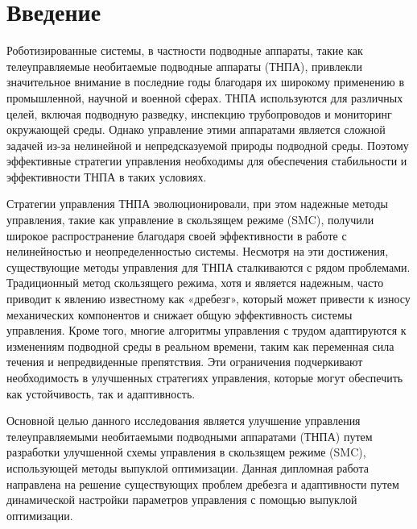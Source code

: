 \chapter{Введение}
\label{chap:intro}

Роботизированные системы, в частности подводные аппараты, такие как телеуправляемые необитаемые подводные аппараты (ТНПА), привлекли значительное внимание в последние годы благодаря их широкому применению в промышленной, научной и военной сферах. ТНПА используются для различных целей, включая подводную разведку, инспекцию трубопроводов и мониторинг окружающей среды. Однако управление этими аппаратами является сложной задачей из-за нелинейной и непредсказуемой природы подводной среды. Поэтому эффективные стратегии управления необходимы для обеспечения стабильности и эффективности ТНПА в таких условиях.

Стратегии управления ТНПА эволюционировали, при этом надежные методы управления, такие как управление в скользящем режиме (SMC), получили широкое распространение благодаря своей эффективности в работе с нелинейностью и неопределенностью системы. Несмотря на эти достижения, существующие методы управления для ТНПА сталкиваются с рядом проблемами. Традиционный метод скользящего режима, хотя и является надежным, часто приводит к явлению известному как «дребезг», который может привести к износу механических компонентов и снижает общую эффективность системы управления. Кроме того, многие алгоритмы управления с трудом адаптируются к изменениям подводной среды в реальном времени, таким как переменная сила течения и непредвиденные препятствия. Эти ограничения подчеркивают необходимость в улучшенных стратегиях управления, которые могут обеспечить как устойчивость, так и адаптивность.

Основной целью данного исследования является улучшение управления телеуправляемыми необитаемыми подводными аппаратами (ТНПА) путем разработки улучшенной схемы управления в скользящем режиме (SMC), использующей методы выпуклой оптимизации. Данная дипломная работа направлена на решение существующих проблем дребезга и адаптивности путем динамической настройки параметров управления с помощью выпуклой оптимизации.
